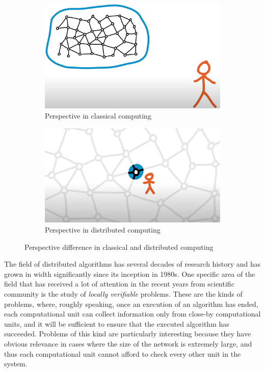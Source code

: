 \begin{figure}
  \centering
  \begin{subfigure}[b]{0.49\textwidth}
      \centering
      \includegraphics[width=\textwidth]{images/classical-computing.png}
      \caption{Perspective in classical computing}
      \label{fig:classical-computing}
  \end{subfigure}
  \hfill
  \begin{subfigure}[b]{0.49\textwidth}
      \centering
      \includegraphics[width=\textwidth]{images/distributed-computing.png}
      \caption{Perspective in distributed computing}
      \label{fig:three sin x}
  \end{subfigure}
  \caption{Perspective difference in classical and distributed computing}
  \label{fig:classical-vs-distributed-computing}
\end{figure}

The field of distributed algorithms has several
decades of research history and has grown
in width significantly since its inception in 1980s.
One specific
area of the field that has received a lot of
attention in the recent years from scientific
community is the study of \emph{locally verifiable}
problems.
These are the kinds of problems, where, roughly speaking,
once an execution of an algorithm has ended, each
computational unit can
collect information only from close-by computational units,
and it will be sufficient to ensure that the executed algorithm has succeeded. Problems of this kind are particularly
interesting because they have obvious relevance
in cases where the size of the network is extremely
large, and thus each computational unit
cannot afford to check every other unit in the system.

